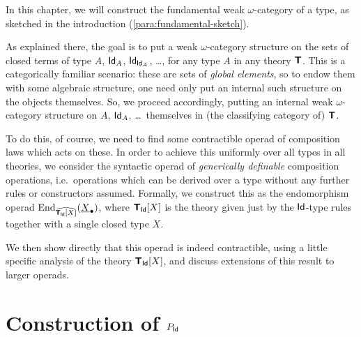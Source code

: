 
\newcommand{\idelim}[5]{\Jterm_(#2;\,#3,#4,#5)}

\newcommand{\miniqed}{$\diamond$}

\newcommand{\doubleqed}{$\diamond$}






In this chapter, we will construct the fundamental weak $\omega$-category of a type, as sketched in the introduction (\ref{para:fundamental-sketch}).

As explained there, the goal is to put a weak $\omega$-category structure on the sets of closed terms of type $A$, $\mathsf{Id}_A$, $\mathsf{Id}_{\mathsf{Id}_A}$, \ldots, for any type $A$ in any theory $\textbf{\textsf{T}}$.  This is a categorically familiar scenario: these are sets of \emph{global elements}, so to endow them with some algebraic structure, one need only put an internal such structure on the objects themselves.  So, we proceed accordingly, putting an internal weak $\omega$-category structure on $A$, $\mathsf{Id}_A$, \ldots\ themselves in (the classifying category of) $\textbf{\textsf{T}}$.

To do this, of course, we need to find some contractible operad of composition laws which acts on these.  In order to achieve this uniformly over all types in all theories, we consider the syntactic operad of \emph{generically definable} composition operations, i.e.\ operations which can be derived over a type without any further rules or constructors assumed.  Formally, we construct this as the endomorphism operad $\mathrm{End}_{\widehat{\textbf{\textsf{T}}_{\mathsf{Id}} [X]}}(\underline{X}_\bullet)$, where $\textbf{\textsf{T}}_{\mathsf{Id}} [X]$ is the theory given just by the $\mathsf{Id}$-type rules together with a single closed type $X$.

We then show directly that this operad is indeed contractible, using a little specific analysis of the theory $\textbf{\textsf{T}}_{\mathsf{Id}}[X]$, and discuss extensions of this result to larger operads.

\section{Construction of \texorpdfstring{$P_{\mathsf{Id}}$}{P\_Id}}

